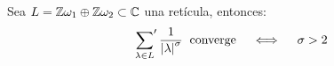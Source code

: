 \begin{prop}\label{lema:conv_abs_sobre_reticula} %
  Sea $L=\mathbb{Z}\omega_1\oplus\mathbb{Z}\omega_2\subset\mathbb{C}$ una ret\'icula, entonces:
  \[
    \sideset{}{'}\sum_{\lambda\in L}\frac{1}{\left| \lambda \right|^{\sigma}}\;\;\text{converge}
    \quad\iff\quad\sigma>2
  \]
\end{prop}%

